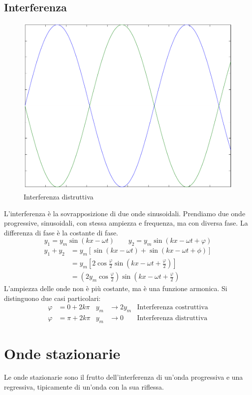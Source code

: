 \subsection{Interferenza}
\begin{figure}[htbp]
   \centering
   \includegraphics[scale=0.5]{immagini/fisica1/interferenza_distruttiva}
   \caption{Interferenza distruttiva}
\end{figure}
L'interferenza è la sovrapposizione di due onde sinusoidali. Prendiamo due onde progressive, sinusoidali, con stessa ampiezza e frequenza, ma con diversa fase. La differenza di fase è la costante di fase.
\[y_1=y_m\sin(kx-\omega t)\qquad y_2=y_m\sin(kx-\omega t+\varphi)\]
\begin{align*}
y_1+y_2&=y_m\left[\sin\left(kx-\omega t\right)+\sin\left(kx-\omega t+\phi\right)\right]\\
&=y_m\left[2\cos\frac{\varphi}{2}\sin\left(kx-\omega t+\frac{\varphi}{2}\right)\right]\\
&=\left(2y_m\cos\frac{\varphi}{2}\right)\sin\left(kx-\omega t+\frac{\varphi}{2}\right)
\end{align*}
L'ampiezza delle onde non è più costante, ma è una funzione armonica. Si distinguono due casi particolari:
\begin{align*}
\varphi&=0+2k\pi&y_m&\rightarrow 2y_m&\text{Interferenza costruttiva}\\
\varphi&=\pi+2k\pi&y_m&\rightarrow 0&\text{Interferenza distruttiva}
\end{align*}
\section{Onde stazionarie}
Le onde stazionarie sono il frutto dell'interferenza di un'onda progressiva e una regressiva, tipicamente di un'onda con la sua riflessa.

